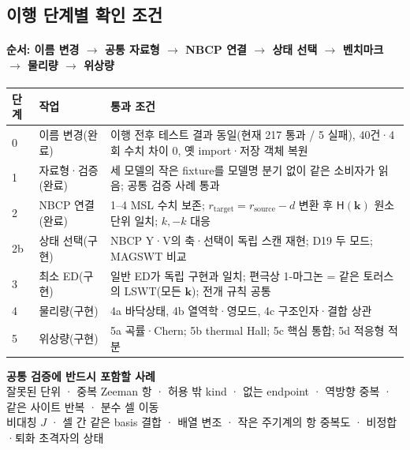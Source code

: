 \subsection{이행 단계별 확인 조건}\label{next-steps}
\begingroup%
  \framesubtitle{순서: 이름 변경 $\to$ 공통 자료형 $\to$ NBCP 연결 $\to$ 상태 선택 $\to$ 벤치마크 $\to$ 물리량 $\to$ 위상량}
  \small\renewcommand{\arraystretch}{1.1}
  \begin{tabularx}{\textwidth}{@{}p{0.6cm}p{2.6cm}Y@{}}
    \toprule
    단계 & 작업 & 통과 조건 \\
     & 이름 변경(완료) & 이행 전후 테스트 결과 동일(현재 217 통과 / 5 실패), 40건·4회 수치 차이 0, 옛 import·저장 객체 복원 \\
    1 & 자료형·검증(완료) & 세 모델의 작은 fixture를 모델명 분기 없이 같은 소비자가 읽음; 공통 검증 사례 통과 \\
    2 & NBCP 연결(완료) & 1--4 MSL 수치 보존; $r_{\mathrm{target}}=r_{\mathrm{source}}-d$ 변환 후 $\mathsf H(\mathbf k)$ 원소 단위 일치; $k,-k$ 대응 \\
    2b & 상태 선택(구현) & NBCP Y·V의 축·선택이 독립 스캔 재현; D19 두 모드; MAGSWT 비교 \\
    3 & 최소 ED(구현) & 일반 ED가 독립 구현과 일치; 편극상 1-마그논 = 같은 토러스의 LSWT(모든 $\mathbf k$); 전개 규칙 공통 \\
    4 & 물리량(구현) & 4a 바닥상태, 4b 열역학·영모드, 4c 구조인자·결합 상관 \\
    5 & 위상량(구현) & 5a 곡률·Chern; 5b thermal Hall; 5c 핵심 통합; 5d 적응형 적분 \\
    \bottomrule
  \end{tabularx}
  \par\smallskip
  \textbf{공통 검증에 반드시 포함할 사례}\\[0.3em]
  잘못된 단위 · 중복 Zeeman 항 · 허용 밖 kind · 없는 endpoint · 역방향 중복 · 같은 사이트 반복 · 분수 셀 이동\\
  비대칭 $J$ · 셀 간 같은 basis 결합 · 배열 변조 · 작은 주기계의 항 중복도 · 비정합·퇴화 초격자의 상태
  \par\medskip
\endgroup



